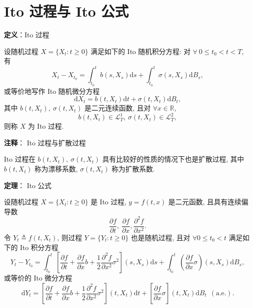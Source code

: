 \documentclass[openany]{ctexbook}
\theoremstyle{kaiti}
\theoremstyle{normal}
\begin{document}
\section{Ito 过程与 Ito 公式}

\textbf{定义}：Ito 过程

设随机过程 $X=\{X_t:t\geqslant0\}$ 满足如下的 Ito 随机积分方程: 对 $\forall~0\leqslant t_0<t<T$, 有
\begin{equation}
  X_t-X_{t_0}=\int_{t_0}^tb(s,X_s)\mathrm{d}s+\int_{t_0}^t\sigma(s,X_s)\mathrm{d}B_s,
\end{equation}
 或等价地写作 Ito 随机微分方程
\begin{equation}
  \mathrm{d}X_t=b(t,X_t)\mathrm{d}t+\sigma(t,X_t)\mathrm{d}B_t,
\end{equation}
 其中 $b(t,X_t),~\sigma(t,X_t)$ 是二元连续函数, 且对 $\forall x\in\mathbb{R}$,
\begin{equation}
  b(t,X_t)\in\mathcal{L}_T^1,~ \sigma(t,X_t)\in\mathcal{L}_T^2,
\end{equation}
 则称 $X$ 为 Ito 过程.

\textbf{注释}： Ito 过程与扩散过程

Ito 过程在 $b(t,X_t),~\sigma(t,X_t)$ 具有比较好的性质的情况下也是扩散过程, 其中 $b(t,X_t)$ 称为漂移系数, $\sigma(t,X_t)$ 称为扩散系数.

\textbf{定理}： Ito 公式

设随机过程 $X=\{X_t:t\geqslant0\}$ 是 Ito 过程, $y=f(t,x)$ 是二元函数, 且具有连续偏导数
\begin{equation}
  \frac{\partial f}{\partial t},~\frac{\partial f}{\partial x},\frac{\partial^2 f}{\partial x^2}.
\end{equation}
 令 $Y_t\triangleq f(t,X_t)$, 则过程 $Y=\{Y_t:t\geqslant0\}$ 也是随机过程, 且对 $\forall0\leqslant t_0<t$ 满足如下的 Ito 积分方程
\begin{equation}
  Y_t-Y_{t_0}=\int_{t_0}^t\left[\frac{\partial f}{\partial t}+\frac{\partial f}{\partial x}b+\frac{1}{2}\frac{\partial^2 f}{\partial x^2}\sigma^2\right](s,X_s)\mathrm{d}s+\int_{t_0}^t\left(\frac{\partial f}{\partial x}\sigma\right)(s,X_s)\mathrm{d}B_s,
\end{equation}
 或等价的 Ito 微分方程
\begin{equation}
  \mathrm{d}Y_t=\left[\frac{\partial f}{\partial t}+\frac{\partial f}{\partial x}b+\frac{1}{2}\frac{\partial^2 f}{\partial x^2}\sigma^2\right](t,X_t)\mathrm{d}t+\left[\frac{\partial f}{\partial x}\sigma\right](t,X_t)\mathrm{d}B_t~~(\text{a.e.}).
\end{equation}
\end{document}
